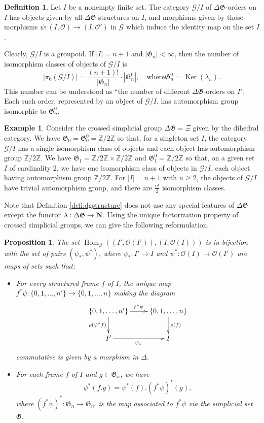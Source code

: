 \documentclass[english,11pt,leqno]{article}
\def\Gen{\mathfrak{G}}
\def\Gc{\mathcal{G}}
\def\Oc{\mathcal{O}}
\def\Hom{\operatorname{Hom}}
\def\Ker{\operatorname{Ker}\nolimits}
\def\Hom{\operatorname{Hom}}
\def\Zt{\mathbb{Z}/2\mathbb{Z}}
\def\DG{ {\Delta \Gen}}
\newtheorem{prop}[thm]{Proposition}
\theoremstyle{definition}
\newtheorem{defi}[thm]{Definition}
\newtheorem{exa}[thm]{Example}
\theoremstyle{remark}
\numberwithin{equation}{section}
\begin{document}
\begin{defi}
Let $I$ be a nonempty finite set. The category $\Gc/I$ of $\DG$-orders on $I$ has objects given by all
$\DG$-structures on $I$, and morphisms given by those morphisms $\psi: (I,\Oc)\to (I, \Oc')$
in $\Gc$ which induce the identity map on the set $I$.
\end{defi}

Clearly, $\Gc/I$ is a groupoid. If $|I|=n+1$ and $|\Gen_n|<\infty$, then the number of isomorphism
classes of objects of $\Gc/I$ is
\[
|\pi_0(\Gc/I)| = \frac{(n+1)!}{|\Gen_n|} \cdot |\Gen_n^0|, \quad \text{where
$\Gen_n^0=\Ker(\lambda_n)$.} 
\]
This number can be understood as ``the number of different $\DG$-orders on $I$". Each such order,
represented by an object of $\Gc/I$, has automorphism group isomorphic to $\Gen_n^0$. 

\begin{exa} Consider the crossed simplicial group $\DG = \Xi$ given by the dihedral category.  We
	have $\Gen_0 = \Gen_0^0 = \Zt$ so that, for a singleton set $I$, the category $\Gc/I$ has a
	single isomorphism class of objects and each object has automorphism group $\Zt$.  We have
	$\Gen_1 = \Zt \times \Zt$ and $\Gen_1^0 = \Zt$ so that, on a given set $I$ of cardinality
	$2$, we have one isomorphism class of objects in $\Gc/I$, each object having automorphism
	group $\Zt$. For $|I| = n+1$ with $n \ge 2$, the objects of $\Gc/I$ have trivial
	automorphism group, and there are $\frac{n!}{2}$ isomorphism classes.
\end{exa}

Note that Definition \ref{defi:dgstructure} does not use any special features of $\DG$ except the functor
$\lambda:\DG \to \bf N$. Using the unique factorization property of crossed simplicial groups, we can
give the following reformulation. 

\begin{prop}\label{prop:morphisms-Gc}
The set $\Hom_\Gc((I', \Oc(I')), (I, \Oc(I)))$ is in bijection with the set of pairs
$(\psi_*, \psi^*)$, where $\psi_*: I'\to I$ and $\psi^*: \Oc(I)\to\Oc(I')$ are maps of sets such that:
\begin{itemize}
\item[(i)] For every structured frame $f$ of $I$, the unique map $f^*\psi: \{0,1,\dots, n'\}\to \{0,1,\dots, n\}$ making the
diagram
\[
\xymatrix{
\{0,1,\dots,n'\} 
\ar[d]_{\rho(\psi^*f)}\ar[r]^{f^*\psi }& \{0,1,\dots,n\} 
\ar[d]^{\rho(f)}
\\
I'\ar[r]_{\psi_*}&I
}
\]
commutative is given by a morphism in $\Delta$. 

\item[(ii)] For each frame $f$ of $I$ and $g\in\Gen_n$, we have
\[
\psi^*(f .  g) = \psi^*(f) . (f^*\psi)^*(g), 
\]
where $(f^*\psi)^*: \Gen_n\to\Gen_{n'}$ is the map associated to $f^*\psi$ via the simplicial set
$\Gen$. 
\end{itemize}
\end{prop}
\end{document}
